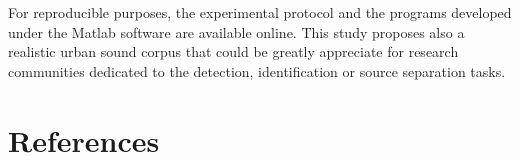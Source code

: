 \documentclass[review,5p,twocolumn,sort&compress,times]{elsarticle}
\begin{document}
For reproducible purposes, the experimental protocol and the programs developed under the Matlab software are available online. This study proposes also a realistic urban sound corpus that could be greatly appreciate for research communities dedicated to the detection, identification or source separation tasks.


\section*{References}


\end{document}
